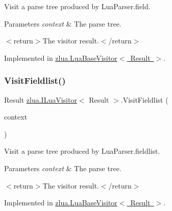 Visit a parse tree produced by Lua\+Parser.\+field. 


\begin{DoxyParams}{Parameters}
{\em context} & The parse tree.\\
\hline
\end{DoxyParams}
$<$return$>$The visitor result.$<$/return$>$ 

Implemented in \mbox{\hyperlink{classzlua_1_1_lua_base_visitor_a4088fd943be175aab9ed0830ce42127f}{zlua.\+Lua\+Base\+Visitor$<$ Result $>$}}.

\mbox{\label{interfacezlua_1_1_i_lua_visitor_a5e96f0fd7b286fbdbac993c6832ee7af}} 
\subsubsection{\texorpdfstring{Visit\+Fieldlist()}{VisitFieldlist()}}
{\footnotesize\ttfamily Result \mbox{\hyperlink{interfacezlua_1_1_i_lua_visitor}{zlua.\+I\+Lua\+Visitor}}$<$ Result $>$.Visit\+Fieldlist (\begin{DoxyParamCaption}\item[{\mbox{[}\+Not\+Null\mbox{]} \mbox{\hyperlink{classzlua_1_1_lua_parser_1_1_fieldlist_context}{Lua\+Parser.\+Fieldlist\+Context}}}]{context }\end{DoxyParamCaption})}



Visit a parse tree produced by Lua\+Parser.\+fieldlist. 


\begin{DoxyParams}{Parameters}
{\em context} & The parse tree.\\
\hline
\end{DoxyParams}
$<$return$>$The visitor result.$<$/return$>$ 

Implemented in \mbox{\hyperlink{classzlua_1_1_lua_base_visitor_a743339d1d6b13b9a3c334604cbae43e0}{zlua.\+Lua\+Base\+Visitor$<$ Result $>$}}.

\mbox{\label{interfacezlua_1_1_i_lua_visitor_a9b0b2dc2b7d35b07f48b025e06b5e8e6}} 
